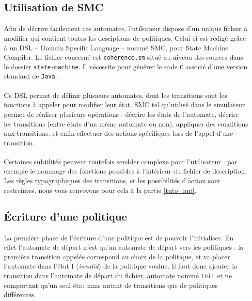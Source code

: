 \subsection{Utilisation de SMC}

\paragraph{}
Afin de décrire facilement ces automates, l'utilsateur dispose d'un unique fichier à modifier qui contient toutes les desciptions de politiques. Celui-ci est rédigé grâce à un DSL -- Domain Specific Language -- nommé \textsf{SMC}, pour State Machine Compiler. Le fichier concerné est \verb!coherence.sm! situé au niveau des sources dans le dossier \verb!state-machine!. Il nécessite pour générer le code \texttt{C} associé d'une version standard de \texttt{Java}.

\paragraph{}
Ce DSL permet de définir plusieurs automates, dont les transitions sont les fonctions à appeler pour modifier leur état. \textsf{SMC} tel qu'utilisé dans le simulateur permet de réaliser plusieurs opérations : décrire les états de l'automate, décrire les transitions (entre états d'un même automate ou non), appliquer des conditions aux transitions, et enfin effectuer des actions spécifiques lors de l'appel d'une transition.

\paragraph{}
Certaines subtilités peuvent toutefois sembler complexe pour l'utilisateur : par exemple le nommage des fonctions possibles à l'intérieur du fichier de description. Les règles typographiques des transitions, et les possibilités d'action sont restreintes, nous vous renvoyons pour cela à la partie \ref{tuto_aut}.

\subsection{\'Ecriture d'une politique}

\paragraph{}
La première phase de l'écriture d'une politique est de pouvoir l'initialiser. En effet l'automate de départ n'est qu'un automate de départ vers les politiques : la première transition appelée correspond au choix de la politique, et va placer l'automate dans l'état I (\emph{invalid}) de la politique voulue. Il faut donc ajouter la transition dans l'automate de départ du fichier, automate nommé \texttt{Init} et ne comportant qu'un seul état mais autant de transitions que de politiques différentes.

